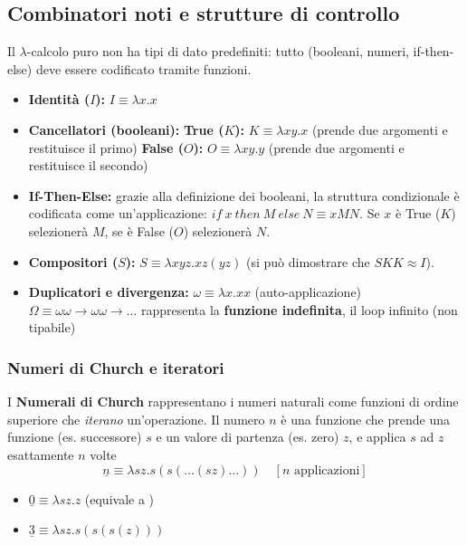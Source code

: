 \documentclass[a4paper,11pt]{report}
\begin{document}
\subsection{Combinatori noti e strutture di controllo}
Il $\lambda$-calcolo puro non ha tipi di dato predefiniti: tutto (booleani, numeri, if-then-else) deve essere codificato tramite funzioni.

\begin{itemize}
    \item \textbf{Identità ($I$):} $I \equiv \lambda x.x$
    \item \textbf{Cancellatori (booleani):}
        \subitem \textbf{True ($K$):} $K \equiv \lambda x y. x$ (prende due argomenti e restituisce il primo)
        \subitem \textbf{False ($O$):} $O \equiv \lambda x y. y$ (prende due argomenti e restituisce il secondo)
    \item \textbf{If-Then-Else:} grazie alla definizione dei booleani, la struttura condizionale è codificata come un'applicazione: $if\ x\ then\ M\ else\ N \equiv x M N$. Se $x$ è True ($K$) selezionerà $M$, se è False ($O$) selezionerà $N$.
    \item \textbf{Compositori ($S$):} $S \equiv \lambda x y z. x z (y z)$ (si può dimostrare che $S K K \approx I$).
    \item \textbf{Duplicatori e divergenza:} 
        \subitem $\omega \equiv \lambda x.xx$ (auto-applicazione)
        \subitem $\Omega \equiv \omega \omega \rightarrow \omega \omega \rightarrow \dots$ rappresenta la \textbf{funzione indefinita}, il loop infinito (non tipabile)
\end{itemize}

\subsubsection{Numeri di Church e iteratori}
I \textbf{Numerali di Church} rappresentano i numeri naturali come funzioni di ordine superiore che \textit{iterano} un'operazione. Il numero $n$ è una funzione che prende una funzione (es. successore) $s$ e un valore di partenza (es. zero) $z$, e applica $s$ ad $z$ esattamente $n$ volte
$$\underline{n} \equiv \lambda s z. s(s(\dots(sz)\dots)) \quad [n\text{ applicazioni}]$$
\begin{itemize}
    \item $\underline{0} \equiv \lambda s z. z$ (equivale a )
    \item $\underline{3} \equiv \lambda s z. s(s(s(z)))$
\end{itemize}
\end{document}
